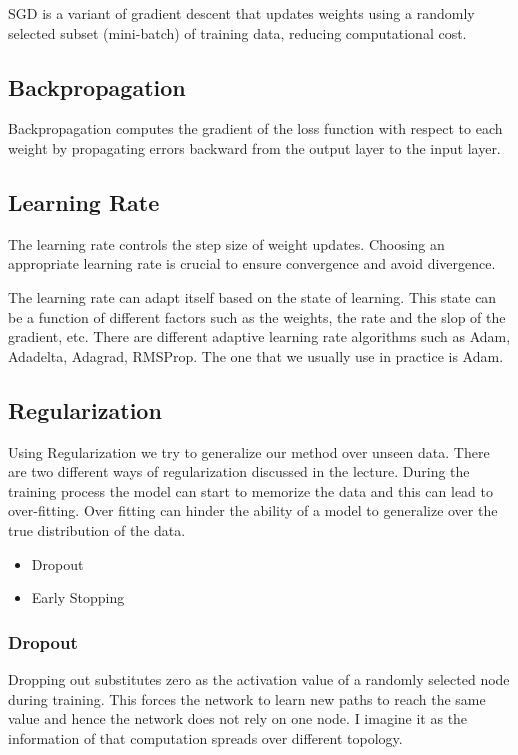 \documentclass[a4paper,12pt]{article}
\begin{document}
\begin{tcolorbox}[colback=blue!5!white,colframe=blue!75!black,title=Stochastic Gradient Descent]
  SGD is a variant of gradient descent that updates weights using a randomly selected subset (mini-batch)
  of training data, reducing computational cost.
\end{tcolorbox}

\subsection{Backpropagation}
Backpropagation computes the gradient of the loss function with respect to each weight by propagating
errors backward from the output layer to the input layer.

\subsection{Learning Rate}
The learning rate controls the step size of weight updates. Choosing an appropriate learning rate is
crucial to ensure convergence and avoid divergence.

The learning rate can adapt itself based on the state of learning. This state can be a function of
different factors such as the weights, the rate and the slop of the gradient, etc.
There are different adaptive learning rate algorithms such as Adam, Adadelta, Adagrad, RMSProp.
The one that we usually use in practice is Adam.

\subsection{Regularization}
Using Regularization we try to generalize our method over unseen data. There are two different ways of regularization discussed
in the lecture. During the training process the model can start to memorize the data and this can lead to over-fitting.
Over fitting can hinder the ability of a model to generalize over the true distribution of the data.
\begin{itemize}
  \item Dropout
  \item Early Stopping
\end{itemize}

\subsubsection{Dropout}
Dropping out substitutes zero as the activation value of a randomly selected node during training. This forces
the network to learn new paths to reach the same value and hence the network does not rely on one node. I imagine it
as the information of that computation spreads over different topology.
\end{document}
